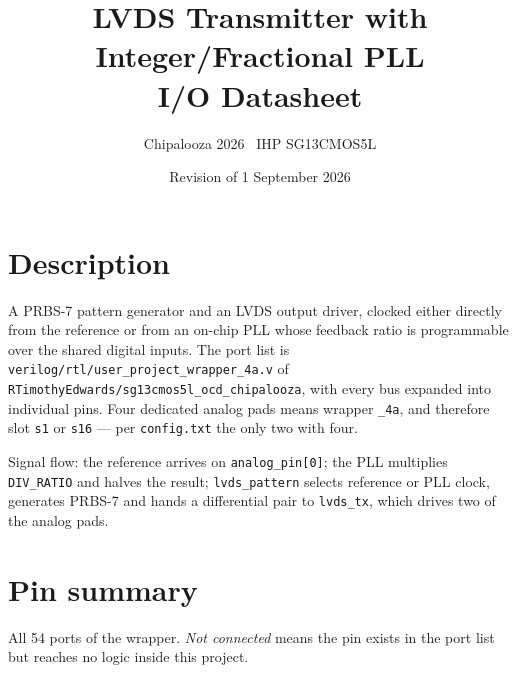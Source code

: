 \documentclass[a4paper,10pt]{article}
\title{\vspace{-12mm}\textbf{LVDS Transmitter with Integer/Fractional PLL}\\[2mm]
       \large I/O Datasheet}
\author{Chipalooza 2026 \textperiodcentered\ IHP SG13CMOS5L}
\date{Revision of 1 September 2026}
\newcommand{\net}[1]{\texttt{#1}}
\begin{document}
\maketitle
\thispagestyle{fancy}

\section{Description}

A PRBS-7 pattern generator and an LVDS output driver, clocked either directly
from the reference or from an on-chip PLL whose feedback ratio is programmable
over the shared digital inputs. The port list is
\texttt{verilog/rtl/user\_project\_wrapper\_4a.v} of
\texttt{RTimothyEdwards/sg13cmos5l\_ocd\_chipalooza}, with every bus expanded
into individual pins. Four dedicated analog pads means wrapper \texttt{\_4a},
and therefore slot \texttt{s1} or \texttt{s16} --- per \texttt{config.txt} the
only two with four.

Signal flow: the reference arrives on \net{analog\_pin[0]}; the PLL multiplies
\net{DIV\_RATIO} and halves the result; \net{lvds\_pattern} selects reference or
PLL clock, generates PRBS-7 and hands a differential pair to \net{lvds\_tx},
which drives two of the analog pads.

\section{Pin summary}

All 54 ports of the wrapper. \emph{Not connected} means the pin exists in the
port list but reaches no logic inside this project.
\end{document}
